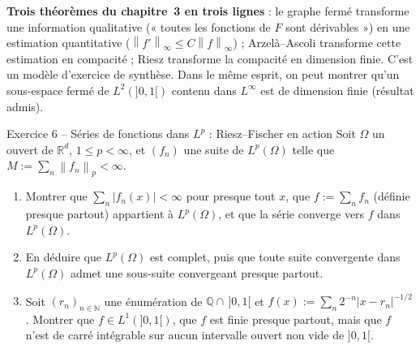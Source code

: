 \documentclass[11pt,a4paper]{article}
\newcommand{\R}{\mathbb{R}}
\newcommand{\N}{\mathbb{N}}
\newcommand{\Q}{\mathbb{Q}}
\newcommand{\norm}[1]{\left\|#1\right\|}
\theoremstyle{definition}
\begin{document}
\begin{pointcle}
\textbf{Trois théorèmes du chapitre~3 en trois lignes} : le graphe fermé transforme une information qualitative (« toutes les fonctions de $F$ sont dérivables ») en une estimation quantitative ($\norm{f'}_\infty\le C\norm f_\infty$) ; Arzelà--Ascoli transforme cette estimation en compacité ; Riesz transforme la compacité en dimension finie. C'est un modèle d'exercice de synthèse. Dans le même esprit, on peut montrer qu'un sous-espace fermé de $L^2(]0,1[)$ contenu dans $L^\infty$ est de dimension finie (résultat admis).
\end{pointcle}

\begin{exo}{Exercice 6 -- Séries de fonctions dans $L^p$ : Riesz--Fischer en action}
Soit $\Omega$ un ouvert de $\R^d$, $1\le p<\infty$, et $(f_n)$ une suite de $L^p(\Omega)$ telle que $M:=\sum_n\norm{f_n}_p<\infty$.
\begin{enumerate}[label=(\alph*)]
  \item Montrer que $\sum_n|f_n(x)|<\infty$ pour presque tout $x$, que $f:=\sum_nf_n$ (définie presque partout) appartient à $L^p(\Omega)$, et que la série converge vers $f$ dans $L^p(\Omega)$.
  \item En déduire que $L^p(\Omega)$ est complet, puis que toute suite convergente dans $L^p(\Omega)$ admet une sous-suite convergeant presque partout.
  \item Soit $(r_n)_{n\in\N}$ une énumération de $\Q\cap\,]0,1[$ et $f(x):=\sum_n2^{-n}|x-r_n|^{-1/2}$. Montrer que $f\in L^1(]0,1[)$, que $f$ est finie presque partout, mais que $f$ n'est de carré intégrable sur aucun intervalle ouvert non vide de $]0,1[$.
\end{enumerate}
\end{exo}
\end{document}

